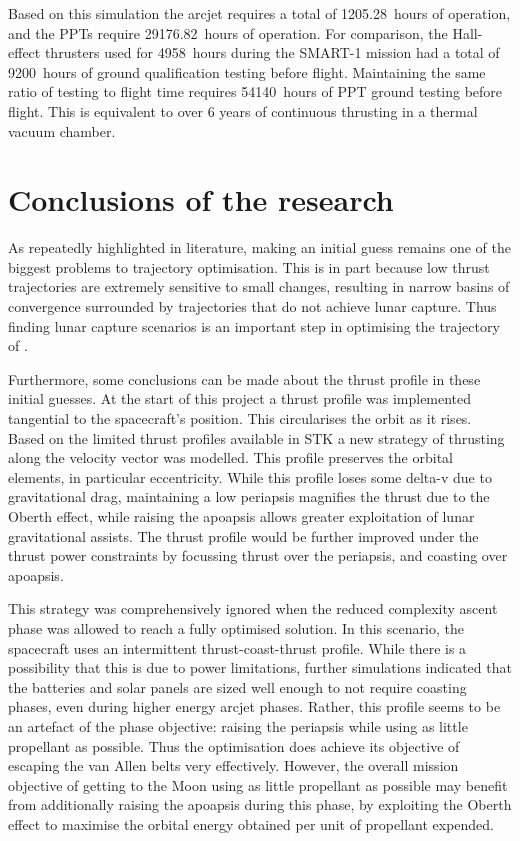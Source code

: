 Based on this simulation the arcjet requires a total of 1205.28~hours of operation, and the PPTs require 29176.82~hours of operation. For comparison, the Hall-effect thrusters used for 4958~hours during the SMART-1 mission had a total of 9200~hours of ground qualification testing before flight. Maintaining the same ratio of testing to flight time requires 54140~hours of PPT ground testing before flight. This is equivalent to over 6 years of continuous thrusting in a thermal vacuum chamber. 




\section{Conclusions of the research}

As repeatedly highlighted in literature, making an initial guess remains one of the biggest problems to trajectory optimisation. This is in part because low thrust trajectories are extremely sensitive to small changes, resulting in narrow basins of convergence surrounded by trajectories that do not achieve lunar capture. Thus finding lunar capture scenarios is an important step in optimising the trajectory of \BW.

Furthermore, some conclusions can be made about the thrust profile in these initial guesses. At the start of this project a thrust profile was implemented tangential to the spacecraft's position. This circularises the orbit as it rises. Based on the limited thrust profiles available in STK a new strategy of thrusting along the velocity vector was modelled. This profile preserves the orbital elements, in particular eccentricity. While this profile loses some delta-v due to gravitational drag, maintaining a low periapsis magnifies the thrust due to the Oberth effect, while raising the apoapsis allows greater exploitation of lunar gravitational assists. The thrust profile would be further improved under the thrust power constraints by focussing thrust over the periapsis, and coasting over apoapsis.

This strategy was comprehensively ignored when the reduced complexity ascent phase was allowed to reach a fully optimised solution. In this scenario, the spacecraft uses an intermittent thrust-coast-thrust profile. While there is a possibility that this is due to power limitations, further simulations indicated that the batteries and solar panels are sized well enough to not require coasting phases, even during higher energy arcjet phases. Rather, this profile seems to be an artefact of the phase objective: raising the periapsis while using as little propellant as possible. Thus the optimisation does achieve its objective of escaping the van Allen belts very effectively. However, the overall mission objective of getting to the Moon using as little propellant as possible may benefit from additionally raising the apoapsis during this phase, by exploiting the Oberth effect to maximise the orbital energy obtained per unit of propellant expended.

